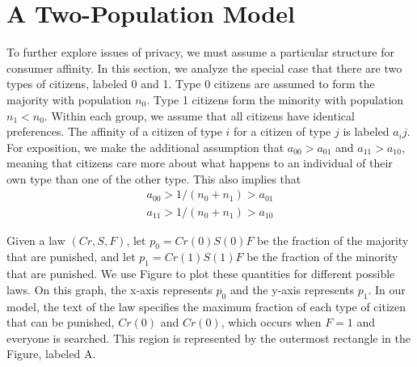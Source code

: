 \section{A Two-Population Model}

To further explore issues of privacy, we must assume a particular structure for consumer affinity.  In this section, we analyze the special case that there are two types of citizens, labeled 0 and 1.  Type 0 citizens are assumed to form the majority with population $n_0$.  Type 1 citizens form the minority with population $n_1 < n_0$.  Within each group, we assume that all citizens have identical preferences.  The affinity of a citizen of type $i$ for a citizen of type $j$ is labeled $a_ij$.  For exposition, we make the additional assumption that $a_{00} > a_{01}$ and $a_{11} > a_{10}$, meaning that citizens care more about what happens to an individual of their own type than one of the other type.  This also implies that 
\begin{align}
a_{00} > 1/(n_0 + n_1) > a_{01} \\
a_{11} > 1/(n_0 + n_1) >  a_{10}
\end{align}

Given a law $(Cr, S, F)$, let $p_0 = Cr(0)S(0)F$ be the fraction of the majority that are punished, and let $p_1 = Cr(1)S(1)F$ be the fraction of the minority that are punished.  We use Figure  to plot these quantities for different possible laws.  On this graph, the x-axis represents $p_0$ and the y-axis represents $p_1$.  In our model, the text of the law specifies the maximum fraction of each type of citizen that can be punished, $Cr(0)$ and $Cr(0)$, which occurs when $F=1$ and everyone is searched.  This region is represented by the outermost rectangle in the Figure, labeled A.

